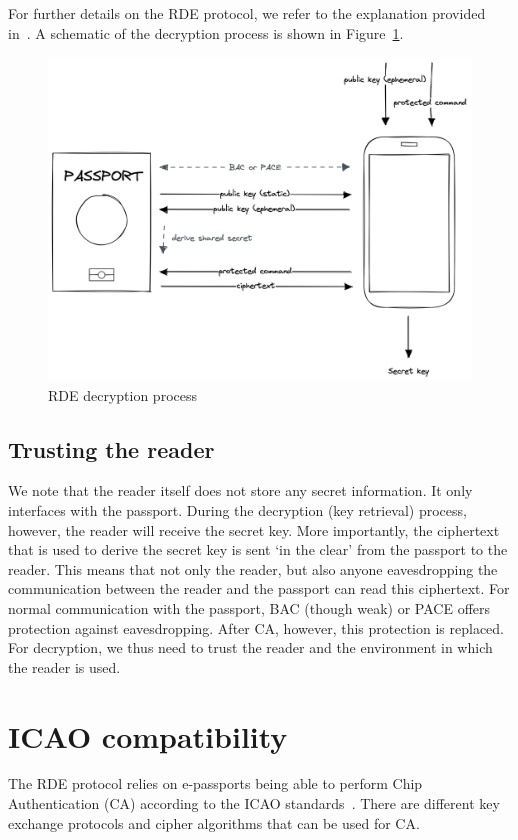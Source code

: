 For further details on the RDE protocol, we refer to the explanation provided in~\cite{verheul2017remote}.
A schematic of the decryption process is shown in Figure~\ref{fig:rde-decryption}.
\begin{figure}
    \centering
    \includegraphics[width=0.8\linewidth]{imgs/RDE decryption}
    \caption{RDE decryption process}
    \label{fig:rde-decryption}
\end{figure}

\subsection{Trusting the reader}\label{subsec:trusting-the-reader}
We note that the reader itself does not store any secret information.
It only interfaces with the passport.
During the decryption (key retrieval) process, however, the reader will receive the secret key.
More importantly, the ciphertext that is used to derive the secret key is sent `in the clear' from the passport to the reader.
This means that not only the reader, but also anyone eavesdropping the communication between the reader and the passport can read this ciphertext.
For normal communication with the passport, BAC (though weak) or PACE offers protection against eavesdropping.
After CA, however, this protection is replaced.
For decryption, we thus need to trust the reader and the environment in which the reader is used.

\section{ICAO compatibility}\label{sec:icao-compatibility}
The RDE protocol relies on e-passports being able to perform Chip Authentication (CA) according to the ICAO standards~\cite{icao9303securitymechanisms}.
There are different key exchange protocols and cipher algorithms that can be used for CA.

